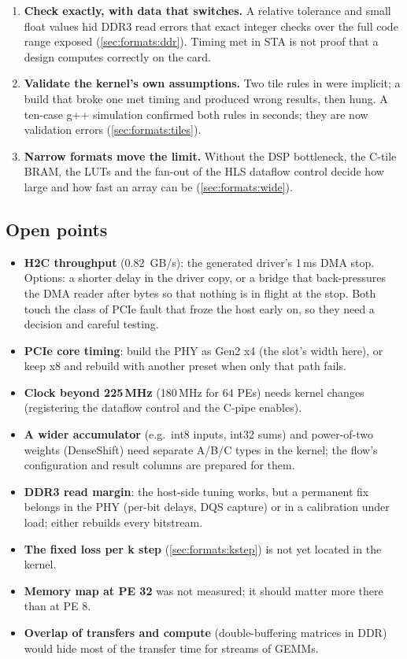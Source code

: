 \begin{enumerate}[leftmargin=1.4em]
        , and kernel utilisation columns read one position off.
  \item \textbf{Check exactly, with data that switches.} A relative tolerance and small float values hid DDR3 read
        errors that exact integer checks over the full code range exposed (\cref{sec:formats:ddr}). Timing met in
        STA is not proof that a design computes correctly on the card.
  \item \textbf{Validate the kernel's own assumptions.} Two tile rules in  were implicit; a build
        that broke one met timing and produced wrong results, then hung. A ten-case g++ simulation confirmed both
        rules in seconds; they are now validation errors (\cref{sec:formats:tiles}).
  \item \textbf{Narrow formats move the limit.} Without the DSP bottleneck, the C-tile BRAM, the LUTs and the fan-out
        of the HLS dataflow control decide how large and how fast an array can be (\cref{sec:formats:wide}).
\end{enumerate}

\subsection{Open points}
\begin{itemize}
  \item \textbf{H2C throughput} (\SI{0.82}{GB/s}): the generated driver's 1\,ms DMA stop. Options: a shorter delay in
        the driver copy, or a bridge that back-pressures the DMA reader after  bytes so that nothing is in
        flight at the stop. Both touch the class of PCIe fault that froze the host early on, so they need a decision
        and careful testing.
  \item \textbf{PCIe core timing}: build the PHY as Gen2 x4 (the slot's width here), or keep x8 and rebuild with
        another preset when only that path fails.
  \item \textbf{Clock beyond 225\,MHz} (180\,MHz for 64 PEs) needs kernel changes (registering the dataflow control
        and the C-pipe enables).
  \item \textbf{A wider accumulator} (e.g.\ int8 inputs, int32 sums) and power-of-two weights (DenseShift) need
        separate A/B/C types in the kernel; the flow's configuration and result columns are prepared for them.
  \item \textbf{DDR3 read margin}: the host-side tuning works, but a permanent fix belongs in the PHY (per-bit
        delays, DQS capture) or in a calibration under load; either rebuilds every bitstream.
  \item \textbf{The fixed loss per k step} (\cref{sec:formats:kstep}) is not yet located in the kernel.
  \item \textbf{Memory map at PE 32} was not measured; it should matter more there than at PE 8.
  \item \textbf{Overlap of transfers and compute} (double-buffering matrices in DDR) would hide most of the transfer
        time for streams of GEMMs.
\end{itemize}

